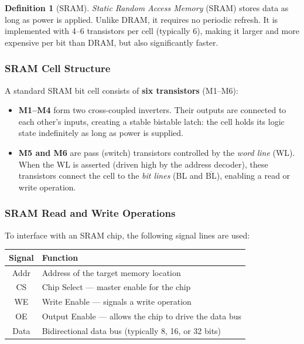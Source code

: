 \documentclass[11pt, a4paper, notitlepage]{report}
\theoremstyle{definition}
\newtheorem{definition}[theorem]{Definition}
\theoremstyle{remark}
\theoremstyle{definition}
\begin{document}
\begin{definition}[SRAM]
  \label{def:sram}
  \emph{Static Random Access Memory} (SRAM) stores data as long as power is applied. Unlike DRAM, it requires no periodic refresh. It is implemented with 4–6 transistors per cell (typically 6), making it larger and more expensive per bit than DRAM, but also significantly faster.
\end{definition}

\subsubsection{SRAM Cell Structure}

A standard SRAM bit cell consists of \textbf{six transistors} (M1–M6):

\begin{itemize}
  \item \textbf{M1–M4} form two cross-coupled inverters. Their outputs are connected to each other's inputs, creating a stable bistable latch: the cell holds its logic state indefinitely as long as power is supplied.
  \item \textbf{M5 and M6} are pass (switch) transistors controlled by the \emph{word line} (WL). When the WL is asserted (driven high by the address decoder), these transistors connect the cell to the \emph{bit lines} (BL and $\overline{\text{BL}}$), enabling a read or write operation.
\end{itemize}

\subsubsection{SRAM Read and Write Operations}

To interface with an SRAM chip, the following signal lines are used:

\begin{center}
\renewcommand{\arraystretch}{1.3}
\begin{tabular}{>{\ttfamily}cl}
  \toprule
  \normalfont Signal & Function \\
  \midrule
  Addr & Address of the target memory location \\
  CS   & Chip Select — master enable for the chip \\
  WE   & Write Enable — signals a write operation \\
  OE   & Output Enable — allows the chip to drive the data bus \\
  Data & Bidirectional data bus (typically 8, 16, or 32 bits) \\
  \bottomrule
\end{tabular}
\end{center}
\end{document}
